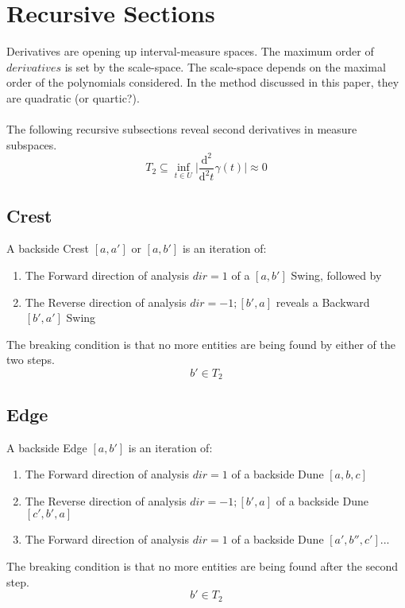 \documentclass{report}
\begin{document}
\section{Recursive Sections}
Derivatives are opening up interval-measure spaces. The maximum order of $derivatives$ is set by the scale-space. The scale-space depends on the maximal order of the polynomials considered. In the method discussed in this paper, they are quadratic (or quartic?).\\\\
The following recursive subsections reveal second derivatives in measure subspaces.
\begin{equation}
T_{2} \subseteq \inf_{t \in U} \lvert \frac{\mathrm{d}^2}{\mathrm{d}^2t}\gamma(t) \rvert \approx 0
\end{equation}

\subsection{Crest}
A backside Crest $[a,a']$ or $[a,b']$ is an iteration of:
\begin{enumerate}
\item The Forward direction of analysis $dir=1$ of a $[a,b']$ Swing, followed by 
\item The Reverse direction of analysis $dir=-1;[b',a]$ reveals a Backward $[b',a']$ Swing
\end{enumerate}
The breaking condition is that no more entities are being found by either of the two steps.
\begin{equation}
b' \in T_{2}
\end{equation}

\subsection{Edge}
A backside Edge $[a,b']$ is an iteration of:
\begin{enumerate}
\item The Forward direction of analysis $dir=1$ of a backside Dune $[a,b,c]$
\item The Reverse direction of analysis $dir=-1;[b',a]$ of a backside Dune $[c',b',a]$ 
\item The Forward direction of analysis $dir=1$ of a backside Dune $[a',b'',c']$...
\end{enumerate}
The breaking condition is that no more entities are being found after the second step.
\begin{equation}
b' \in T_{2}
\end{equation}
\end{document}
